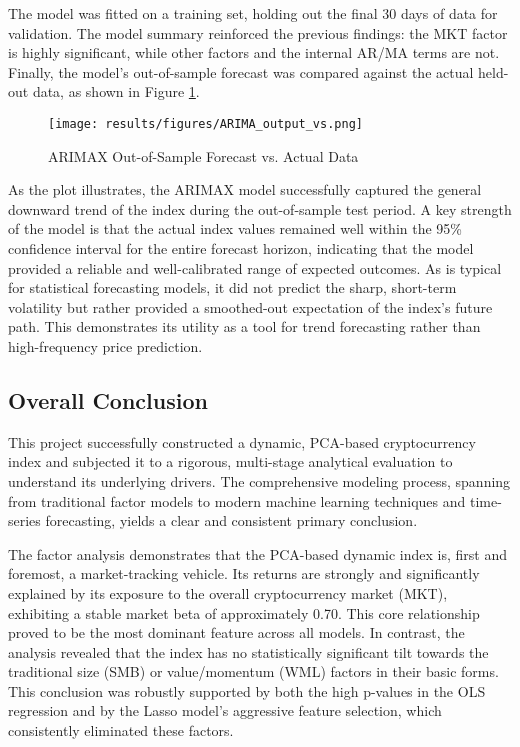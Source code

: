 \documentclass[12pt]{article}
\begin{document}
The model was fitted on a training set, holding out the final 30 days of data for validation. The model summary reinforced the previous findings: the MKT factor is highly significant, while other factors and the internal AR/MA terms are not. Finally, the model's out-of-sample forecast was compared against the actual held-out data, as shown in Figure \ref{fig:arima_forecast}.

\begin{figure}[H]
    \centering
    \texttt{[image: results/figures/ARIMA\_output\_vs.png]}
    \caption{ARIMAX Out-of-Sample Forecast vs. Actual Data}
    \label{fig:arima_forecast}
\end{figure}

As the plot illustrates, the ARIMAX model successfully captured the general downward trend of the index during the out-of-sample test period. A key strength of the model is that the actual index values remained well within the 95\% confidence interval for the entire forecast horizon, indicating that the model provided a reliable and well-calibrated range of expected outcomes. As is typical for statistical forecasting models, it did not predict the sharp, short-term volatility but rather provided a smoothed-out expectation of the index's future path. This demonstrates its utility as a tool for trend forecasting rather than high-frequency price prediction.

\subsection{Overall Conclusion}
This project successfully constructed a dynamic, PCA-based cryptocurrency index and subjected it to a rigorous, multi-stage analytical evaluation to understand its underlying drivers. The comprehensive modeling process, spanning from traditional factor models to modern machine learning techniques and time-series forecasting, yields a clear and consistent primary conclusion.

The factor analysis demonstrates that the PCA-based dynamic index is, first and foremost, a market-tracking vehicle. Its returns are strongly and significantly explained by its exposure to the overall cryptocurrency market (MKT), exhibiting a stable market beta of approximately 0.70. This core relationship proved to be the most dominant feature across all models. In contrast, the analysis revealed that the index has no statistically significant tilt towards the traditional size (SMB) or value/momentum (WML) factors in their basic forms. This conclusion was robustly supported by both the high p-values in the OLS regression and by the Lasso model's aggressive feature selection, which consistently eliminated these factors.
\end{document}

